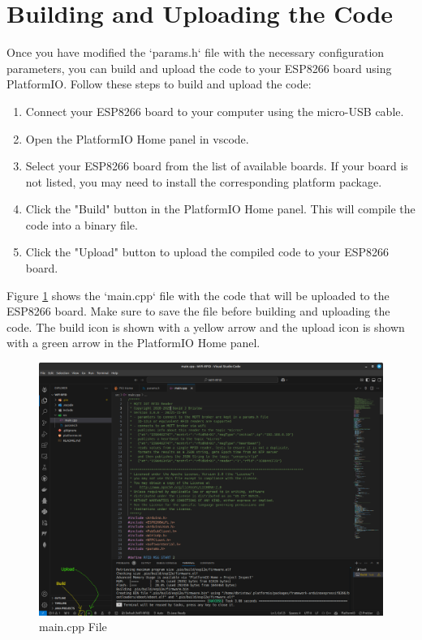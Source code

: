 \section{Building and Uploading the Code}
Once you have modified the `params.h` file with the necessary configuration parameters, you can build and upload the code to your ESP8266 board using PlatformIO. 
Follow these steps to build and upload the code:
\begin{enumerate}
    \item Connect your ESP8266 board to your computer using the micro-USB cable.
    \item Open the PlatformIO Home panel in \gls{vscode}.
    \item Select your ESP8266 board from the list of available boards. If your board is not listed, you may need to install the corresponding platform package.
    \item Click the "Build" button in the PlatformIO Home panel. This will compile the code into a binary file.
    \item Click the "Upload" button to upload the compiled code to your ESP8266 board.
\end{enumerate}
Figure \ref{fig:build} shows the `main.cpp` file with the code that will be uploaded to the ESP8266 board. Make sure to save the file before building and uploading the code.
The build icon is shown with a yellow arrow and the upload icon is shown with a green arrow in the PlatformIO Home panel.
\begin{figure}[H]
    \centering
    \includegraphics[scale=0.33]{./images/vsc-build.png}
    \caption{main.cpp File}
    \label{fig:build}
\end{figure}


